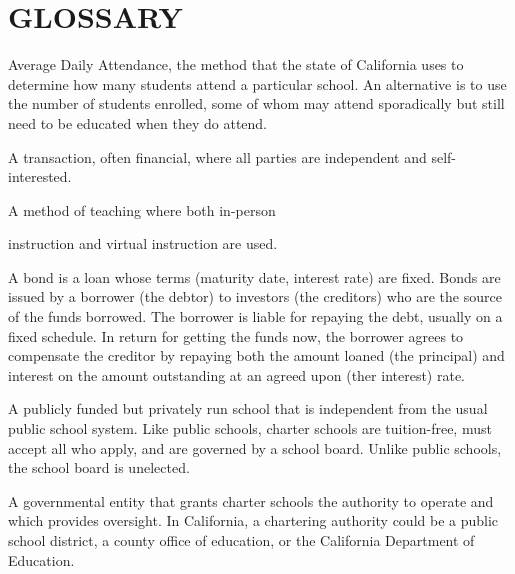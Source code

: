
\chapter[Glossary]{\centering\normalfont\normalsize GLOSSARY}\label{ch:glossary}

\begin{description}[nosep]\DoubleSpacing%

  \medskip\item[ADA] Average Daily Attendance, the method that the state of California uses to determine how many students attend a particular school. An alternative is to use the number of students enrolled, some of whom may attend sporadically but still need to be educated when they do attend. \parencite{SACS2019}

  \medskip\item[arm's length transaction] A transaction, often financial, where all parties are independent and self-interested. \parencite{Wex2024}

  \medskip\item[blended learning] A method of teaching where both in-person

  instruction and virtual instruction are used. \parencite{Graham2018}

  \medskip\item[bond] A bond is a loan whose terms (maturity date, interest rate) are fixed. Bonds are issued by a borrower (the debtor) to investors (the creditors) who are the source of the funds borrowed. The borrower is liable for repaying the debt, usually on a fixed schedule. In return for getting the funds now, the borrower agrees to compensate the creditor by repaying both the amount loaned (the principal) and interest on the amount outstanding at an agreed upon (ther interest) rate. \parencite{Borad2015}

  \medskip\item[charter school] A publicly funded but privately run school that is independent from the usual public school system. Like public schools, charter schools are tuition-free, must accept all who apply, and are governed by a school board. Unlike public schools, the school board is unelected. \parencite{CDE2023, CSBA2016, Eckes2024}

  \medskip\item[charter school authorizer] A governmental entity that grants charter schools the authority to operate and which provides oversight. In California, a chartering authority could be a public school district, a county office of education, or the California Department of Education. \parencite{NACSA2024}


\end{description}

